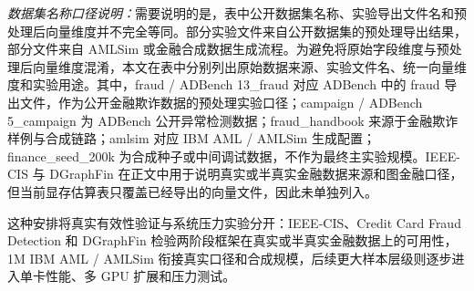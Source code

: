\textit{数据集名称口径说明：}需要说明的是，表中公开数据集名称、实验导出文件名和预处理后向量维度并不完全等同。部分实验文件来自公开数据集的预处理导出结果，部分文件来自 AMLSim 或金融合成数据生成流程。为避免将原始字段维度与预处理后向量维度混淆，本文在表中分别列出原始数据来源、实验文件名、统一向量维度和实验用途。其中，fraud / ADBench 13\_fraud 对应 ADBench 中的 fraud 导出文件，作为公开金融欺诈数据的预处理实验口径；campaign / ADBench 5\_campaign 为 ADBench 公开异常检测数据；fraud\_handbook 来源于金融欺诈样例与合成链路；amlsim 对应 IBM AML / AMLSim 生成配置；finance\_seed\_200k 为合成种子或中间调试数据，不作为最终主实验规模。IEEE-CIS 与 DGraphFin 在正文中用于说明真实或半真实金融数据来源和图金融口径，但当前显存估算表只覆盖已经导出的向量文件，因此未单独列入。

\begin{samepage}
这种安排将真实有效性验证与系统压力实验分开：IEEE-CIS、Credit Card Fraud Detection 和 DGraphFin 检验两阶段框架在真实或半真实金融数据上的可用性，1M IBM AML / AMLSim 衔接真实口径和合成规模，后续更大样本层级则逐步进入单卡性能、多 GPU 扩展和压力测试。
\par
\end{samepage}

